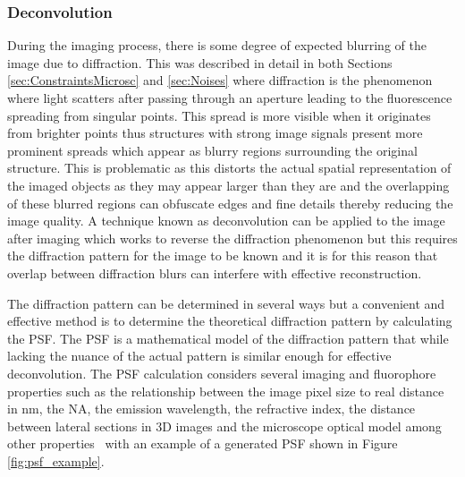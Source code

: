 \subsubsection{Deconvolution}\label{subsec:Decon}
During the imaging process, there is some degree of expected blurring of the image due to diffraction. This was described in detail in both Sections \ref{sec:ConstraintsMicrosc} and \ref{sec:Noises} where diffraction is the phenomenon where light scatters after passing through an aperture leading to the fluorescence spreading from singular points. This spread is more visible when it originates from brighter points thus structures with strong image signals present more prominent spreads which appear as blurry regions surrounding the original structure. This is problematic as this distorts the actual spatial representation of the imaged objects as they may appear larger than they are and the overlapping of these blurred regions can obfuscate edges and fine details thereby reducing the image quality. A technique known as deconvolution can be applied to the image after imaging which works to reverse the diffraction phenomenon but this requires the diffraction pattern for the image to be known and it is for this reason that overlap between diffraction blurs can interfere with effective reconstruction.\par The diffraction pattern can be determined in several ways but a convenient and effective method is to determine the theoretical diffraction pattern by calculating the PSF. The PSF is a mathematical model of the diffraction pattern that while lacking the nuance of the actual pattern is similar enough for effective deconvolution. The PSF calculation considers several imaging and fluorophore properties such as the relationship between the image pixel size to real distance in nm, the NA, the emission wavelength, the refractive index, the distance between lateral sections in 3D images and the microscope optical model among other properties~\cite{psfgen} with an example of a generated PSF shown in Figure \ref{fig:psf_example}.
